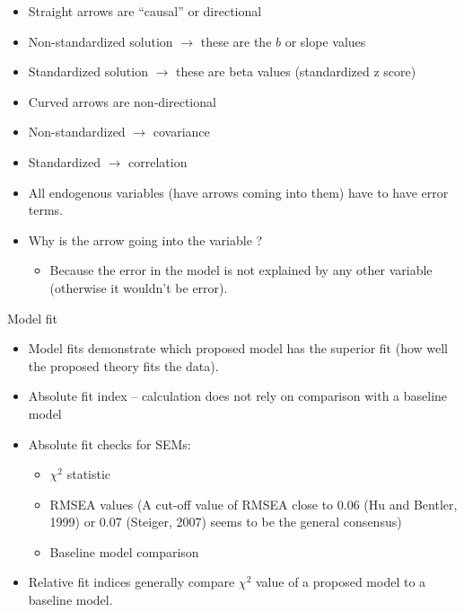 \documentclass[11pt,dvipsnames,ignorenonframetext,aspectratio=169]{beamer}
\providecommand{\tightlist}{%
  \setlength{\itemsep}{0pt}\setlength{\parskip}{0pt}}
\begin{document}
\begin{frame}{}
\protect\hypertarget{section-6}{}
\begin{itemize}
\item
  Straight arrows are ``causal'' or directional
\item
  Non-standardized solution \(\longrightarrow\) these are the \(b\) or
  slope values
\item
  Standardized solution \(\longrightarrow\) these are beta values
  (standardized z score)
\item
  Curved arrows are non-directional
\item
  Non-standardized \(\longrightarrow\) covariance
\item
  Standardized \(\longrightarrow\) correlation
\item
  All endogenous variables (have arrows coming into them) have to have
  error terms.
\item
  Why is the arrow going into the variable ?

  \begin{itemize}
  \tightlist
  \item
    Because the error in the model is not explained by any other
    variable (otherwise it wouldn't be error).
  \end{itemize}
\end{itemize}
\end{frame}

\begin{frame}{Model fit}
\protect\hypertarget{model-fit}{}
\begin{itemize}
\tightlist
\item
  Model fits demonstrate which proposed model has the superior fit (how
  well the proposed theory fits the data).
\item
  Absolute fit index -- calculation does not rely on comparison with a
  baseline model
\item
  Absolute fit checks for SEMs:

  \begin{itemize}
  \tightlist
  \item
    \(\chi^2\) statistic
  \item
    RMSEA values (A cut-off value of RMSEA close to 0.06 (Hu and
    Bentler, 1999) or 0.07 (Steiger, 2007) seems to be the general
    consensus)
  \item
    Baseline model comparison
  \end{itemize}
\item
  Relative fit indices generally compare \(\chi^2\) value of a proposed
  model to a baseline model.
\end{itemize}
\end{frame}
\end{document}
